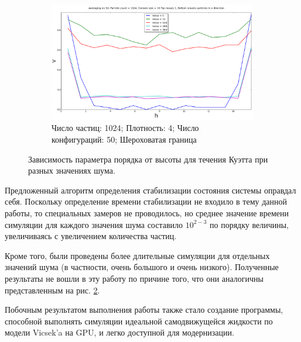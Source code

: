 \begin{figure}
\begin{subfigure}{}
        \end{subfigure}
        \begin{subfigure}{}
            \includegraphics[height=\textheight/3]{Images/1k_x50_NotMirror}
            \caption{Число частиц: 1024; Плотность: 4; Число конфигураций: 50; Шероховатая граница}
            \label{fig:Results:4kNew}
        \end{subfigure}
    \caption{Зависимость параметра порядка от высоты для течения Куэтта при разных значениях шума.}
    \label{fig:Results}
\end{figure}

Предложенный алгоритм определения стабилизации состояния системы оправдал себя. Поскольку определение времени стабилизации не входило в тему данной работы, то специальных замеров не проводилось, но среднее значение времени симуляции для каждого значения шума составило $10^{2-3}$ по порядку величины, увеличиваясь с увеличением количества частиц.

Кроме того, были проведены более длительные симуляции для отдельных значений шума (в частности, очень большого и очень низкого). Полученные результаты не вошли в эту работу по причине того, что они аналогичны представленным на рис. \ref{fig:Results}.

Побочным результатом выполнения работы также стало создание программы, способной выполнять симуляции идеальной самодвижущейся жидкости по модели Vicsek'a на GPU, и легко доступной для модернизации.
   
